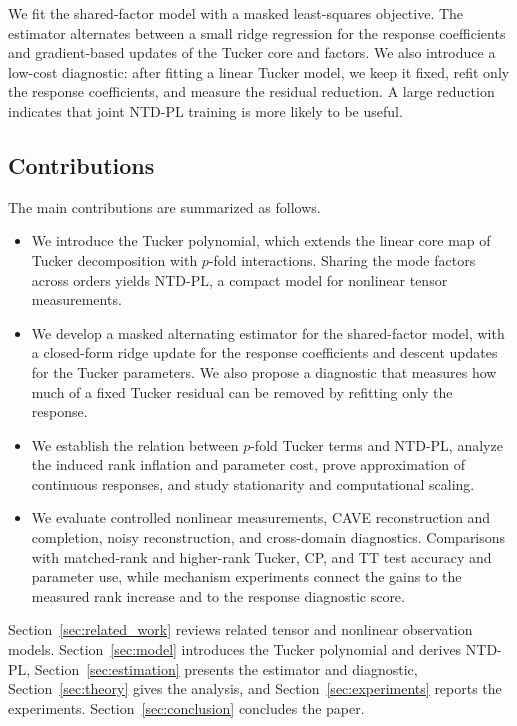 We fit the shared-factor model with a masked least-squares objective. The
estimator alternates between a small ridge regression for the response
coefficients and gradient-based updates of the Tucker core and factors. We also
introduce a low-cost diagnostic: after fitting a linear Tucker model, we keep
it fixed, refit only the response coefficients, and measure the residual
reduction. A large reduction indicates that joint NTD-PL training is more
likely to be useful.

\subsection{Contributions}
\label{subsec:contributions}

The main contributions are summarized as follows.
\begin{itemize}
  \item We introduce the Tucker polynomial, which extends the linear core map
  of Tucker decomposition with $p$-fold interactions. Sharing the mode factors
  across orders yields NTD-PL, a compact model for nonlinear tensor
  measurements.

  \item We develop a masked alternating estimator for the shared-factor model,
  with a closed-form ridge update for the response coefficients and descent
  updates for the Tucker parameters. We also propose a diagnostic that measures
  how much of a fixed Tucker residual can be removed by refitting only the
  response.

  \item We establish the relation between $p$-fold Tucker terms and NTD-PL,
  analyze the induced rank inflation and parameter cost, prove approximation of
  continuous responses, and study stationarity and computational scaling.

  \item We evaluate controlled nonlinear measurements, CAVE
  reconstruction and completion, noisy reconstruction, and cross-domain
  diagnostics. Comparisons with matched-rank and higher-rank Tucker, CP, and TT
  test accuracy and parameter use, while mechanism experiments connect the
  gains to the measured rank increase and to the response diagnostic score.
\end{itemize}

Section~\ref{sec:related_work} reviews related tensor and nonlinear observation
models. Section~\ref{sec:model} introduces the Tucker polynomial and derives
NTD-PL, Section~\ref{sec:estimation} presents the estimator and diagnostic,
Section~\ref{sec:theory} gives the analysis, and
Section~\ref{sec:experiments} reports the experiments. Section~\ref{sec:conclusion}
concludes the paper.

